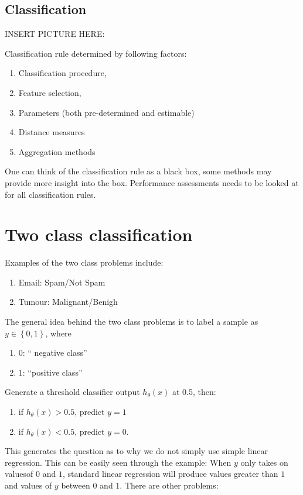 \documentclass[twoside]{article}
\theoremstyle{definition}
\theoremstyle{definition}
\begin{document}
\subsection{Classification}

INSERT PICTURE HERE:

Classification rule determined by following factors:
\begin{enumerate}
	\item Classification procedure,
	\item Feature selection,
	\item Parameters (both pre-determined and estimable)
	\item Distance measures
	\item Aggregation methods
\end{enumerate}
One can think of the classification rule as a black box, some methods may provide more insight into the box. Performance assessments needs to be looked at for all classification rules. 

\section{Two class classification}

Examples of the two class problems include:

\begin{enumerate}
	\item Email: Spam/Not Spam
	\item Tumour: Malignant/Benigh 
\end{enumerate}

The general idea behind the two class problems is to label a sample as $y \in \left\{ 0,1 \right\}$, where \begin{enumerate}
	\item $0$: `` negative class''
	\item $1$: ``positive class''
\end{enumerate}

Generate a threshold classifier output $h_\theta(x)$ at 0.5, then:
\begin{enumerate}
	\item if $h_\theta(x) > 0.5$, predict $y=1$
	\item if $h_\theta(x) < 0.5$, predict $y=0$.
\end{enumerate}

This generates the question as to why we do not simply use simple linear regression. This can be easily seen through the example: When $y$ only takes on valuesof $0$ and $1$, standard linear regression will produce values greater than $1$ and values of $y$ between $0$ and $1$. There are other problems:
\end{document}
